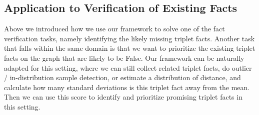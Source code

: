 \subsection{Application to Verification of Existing Facts}
Above we introduced how we use our framework to solve one of the fact verification tasks, namely identifying the likely missing triplet facts. Another task that falls within the same domain is that we want to prioritize the existing triplet facts on the graph that are likely to be False. Our framework can be naturally adapted for this setting, where we can still collect related triplet facts, do outlier / in-distribution sample detection, or estimate a distribution of distance, and calculate how many standard deviations is this triplet fact away from the mean. Then we can use this score to identify and prioritize promising triplet facts in this setting.

\fi